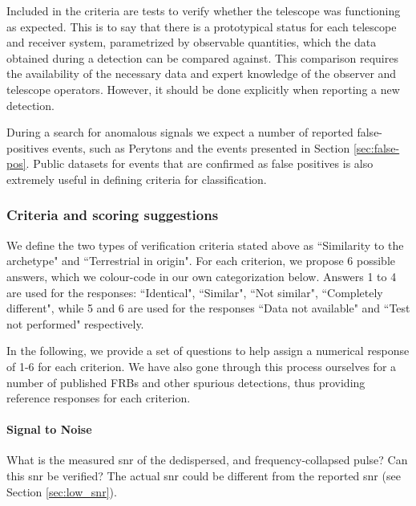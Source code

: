 \documentclass[a4paper,fleqn,usenatbib]{mnras}
\begin{document}
Included in the criteria are tests to verify whether the telescope was functioning as
expected. This is to say that there is a prototypical status for each telescope
and receiver system, parametrized by observable quantities, which the data
obtained during a detection can be compared against.  This comparison requires
the availability of the necessary data and expert knowledge of the observer and
telescope operators. However, it should be done explicitly when reporting a new
detection.

During a search for anomalous signals we expect a number of reported
false-positives events, such as Perytons \citep{2011ApJ...727...18B} and the
events presented in Section \ref{sec:false-pos}. 
Public datasets for events that are confirmed as false positives is also
extremely useful in defining criteria for classification. 

\subsubsection{Criteria and scoring suggestions}
We define the two types of verification criteria stated above as
``Similarity to the archetype" and ``Terrestrial in origin". For each criterion,
we propose 6 possible answers, which we colour-code in our own categorization
below. Answers 1 to 4 are used for the responses: ``Identical", ``Similar", ``Not
similar", ``Completely different", while 5 and 6 are used for the responses
``Data not available" and ``Test not performed" respectively.

In the following, we provide a set of questions to help assign a numerical
response of 1-6 for each criterion. We have also gone through this process
ourselves for a number of published FRBs and other spurious detections, thus
providing reference responses for each criterion.  

\paragraph{Signal to Noise}

What is the measured \gls{snr} of the dedispersed, and frequency-collapsed
pulse? Can this \gls{snr} be verified? The actual \gls{snr} could be different
from the reported \gls{snr} (see Section \ref{sec:low_snr}).
\end{document}
